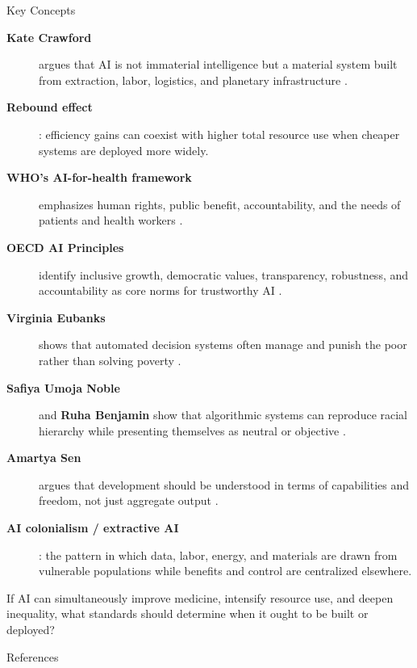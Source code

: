 \documentclass[aspectratio=169,11pt]{beamer}
\begin{document}
\begin{frame}[allowframebreaks]{Key Concepts}
\footnotesize
\begin{description}
    \item[\textbf{Kate Crawford}] argues that AI is not immaterial intelligence but a material system built from extraction, labor, logistics, and planetary infrastructure \parencite{crawford_atlas_ai}.
    \item[\textbf{Rebound effect}]: efficiency gains can coexist with higher total resource use when cheaper systems are deployed more widely.
    \item[\textbf{WHO's AI-for-health framework}] emphasizes human rights, public benefit, accountability, and the needs of patients and health workers \parencite{who_ai_health_2021}.
    \item[\textbf{OECD AI Principles}] identify inclusive growth, democratic values, transparency, robustness, and accountability as core norms for trustworthy AI \parencite{oecd_ai_principles_2024}.
    \item[\textbf{Virginia Eubanks}] shows that automated decision systems often manage and punish the poor rather than solving poverty \parencite{eubanks_automating_inequality}.
    \item[\textbf{Safiya Umoja Noble}] and \textbf{Ruha Benjamin} show that algorithmic systems can reproduce racial hierarchy while presenting themselves as neutral or objective \parencite{noble_algorithms_oppression,benjamin_race_technology}.
    \item[\textbf{Amartya Sen}] argues that development should be understood in terms of capabilities and freedom, not just aggregate output \parencite{sen_development_freedom}.
    \item[\textbf{AI colonialism / extractive AI}]: the pattern in which data, labor, energy, and materials are drawn from vulnerable populations while benefits and control are centralized elsewhere.
\end{description}

\begin{discussionbox}[Discussion]
If AI can simultaneously improve medicine, intensify resource use, and deepen inequality, what standards should determine when it ought to be built or deployed?
\end{discussionbox}
\end{frame}

\begin{frame}[allowframebreaks]{References}
\printbibliography[heading=none]
\end{frame}
\end{document}

